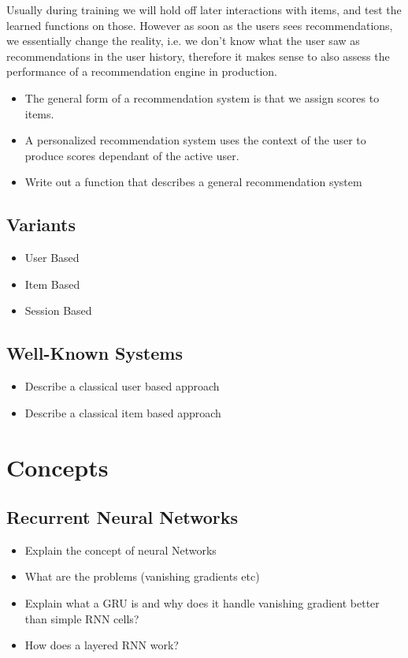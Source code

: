 Usually during training we will hold off later interactions with items, and test the learned functions on those.
However as soon as the users sees recommendations, we essentially change the reality, i.e. we don't know what the user saw as recommendations in the user history, therefore it makes sense to also assess the performance of a recommendation engine in production.
\begin{itemize}
    \item The general form of a recommendation system is that we assign scores to items.
    \item A personalized recommendation system uses the context of the user to produce scores dependant of the active user.
    \item Write out a function that describes a general recommendation system
\end{itemize}
\subsection{Variants}
\begin{itemize}
    \item User Based
    \item Item Based
    \item Session Based
\end{itemize}
\subsection{Well-Known Systems}
\begin{itemize}
    \item Describe a classical user based approach
    \item Describe a classical item based approach
\end{itemize}

\section{Concepts}
\subsection{Recurrent Neural Networks}
\begin{itemize}
    \item Explain the concept of neural Networks
    \item What are the problems (vanishing gradients etc)
    \item Explain what a GRU is and why does it handle vanishing gradient better than simple RNN cells?
    \item How does a layered RNN work?
\end{itemize}
